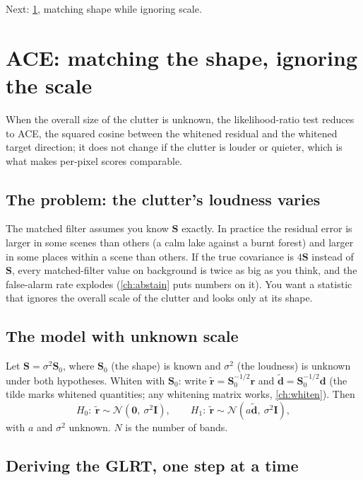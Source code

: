 \documentclass[11pt,a4paper,oneside,openany]{book}
\newcommand{\B}[1]{{\symbf{#1}}}
\newcommand{\B}[1]{{\bm{#1}}}
\newcommand{\vr}{\B{r}}
\newcommand{\vd}{\B{d}}
\newcommand{\mS}{\B{S}}
\newcommand{\mI}{\B{I}}
\newcommand{\nextchapter}[1]{\par\medskip\noindent\hfill\textsf{\small Next: #1}\par}
\begin{document}
\nextchapter{\cref{ch:ace}, matching shape while ignoring scale.}

\chapter{ACE: matching the shape, ignoring the scale}
\label{ch:ace}

\begin{onething}
When the overall size of the clutter is unknown, the likelihood-ratio test reduces to ACE, the squared cosine between the whitened residual and
the whitened target direction; it does not change if the clutter is louder or quieter, which is what makes per-pixel scores comparable.
\end{onething}

\section{The problem: the clutter's loudness varies}

The matched filter assumes you know $\mS$ exactly. In practice the residual error is larger in some scenes than others (a calm lake against a
burnt forest) and larger in some places within a scene than others. If the true covariance is $4\mS$ instead of $\mS$, every matched-filter value
on background is twice as big as you think, and the false-alarm rate explodes (\cref{ch:abstain} puts numbers on it). You want a statistic that
ignores the overall scale of the clutter and looks only at its shape.

\section{The model with unknown scale}

Let $\mS=\sigma^2\mS_0$, where $\mS_0$ (the shape) is known and $\sigma^2$ (the loudness) is unknown under both hypotheses. Whiten with $\mS_0$: write
$\tilde{\vr}=\mS_0^{-1/2}\vr$ and $\tilde{\vd}=\mS_0^{-1/2}\vd$ (the tilde marks whitened quantities; any whitening matrix works, \cref{ch:whiten}). Then
\[
  H_0:\ \tilde{\vr}\sim\mathcal N(\B0,\ \sigma^2\mI),\qquad H_1:\ \tilde{\vr}\sim\mathcal N(a\tilde{\vd},\ \sigma^2\mI),
\]
with $a$ and $\sigma^2$ unknown. $N$ is the number of bands.

\section{Deriving the GLRT, one step at a time}
\end{document}
